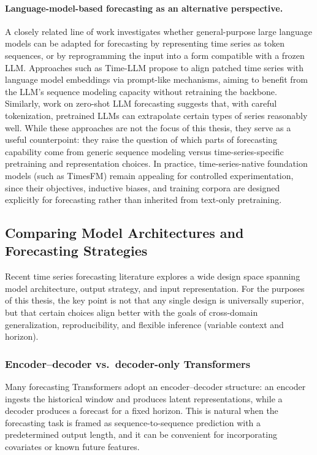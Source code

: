 \paragraph{Language-model-based forecasting as an alternative perspective.}
A closely related line of work investigates whether general-purpose large language models can be adapted for forecasting by representing time series as token sequences, or by reprogramming the input into a form compatible with a frozen LLM. Approaches such as Time-LLM propose to align patched time series with language model embeddings via prompt-like mechanisms, aiming to benefit from the LLM’s sequence modeling capacity without retraining the backbone. Similarly, work on zero-shot LLM forecasting suggests that, with careful tokenization, pretrained LLMs can extrapolate certain types of series reasonably well. While these approaches are not the focus of this thesis, they serve as a useful counterpoint: they raise the question of which parts of forecasting capability come from generic sequence modeling versus time-series-specific pretraining and representation choices. In practice, time-series-native foundation models (such as TimesFM) remain appealing for controlled experimentation, since their objectives, inductive biases, and training corpora are designed explicitly for forecasting rather than inherited from text-only pretraining.


\subsection{Comparing Model Architectures and Forecasting Strategies}

Recent time series forecasting literature explores a wide design space spanning model architecture, output strategy, and input representation. For the purposes of this thesis, the key point is not that any single design is universally superior, but that certain choices align better with the goals of cross-domain generalization, reproducibility, and flexible inference (variable context and horizon).

\subsubsection{Encoder--decoder vs.\ decoder-only Transformers}
Many forecasting Transformers adopt an encoder--decoder structure: an encoder ingests the historical window and produces latent representations, while a decoder produces a forecast for a fixed horizon. This is natural when the forecasting task is framed as sequence-to-sequence prediction with a predetermined output length, and it can be convenient for incorporating covariates or known future features.

